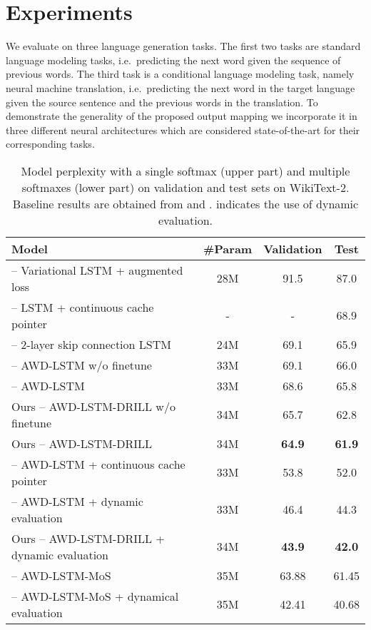 \documentclass{article}
\begin{document}
\section{Experiments}
\label{eval}

We evaluate on three language generation tasks.  The first two tasks are standard language modeling tasks, i.e.~predicting the next word given the sequence of previous words.  The third task is a conditional language modeling task, namely neural machine translation, i.e.~predicting the next word in the target language given the source sentence and the previous words in the translation.  To demonstrate the generality of the proposed output mapping we incorporate it in three different neural architectures which are considered state-of-the-art for their corresponding tasks.

\begin{table*}[t]\small
	\centering
	\begin{tabular}{l|ccc}
		\toprule
		\bf Model & \bf \#Param & \bf Validation &  \bf Test \\
		\midrule
		\citet{inan2016tying} -- Variational LSTM  + augmented loss & 28M & 91.5 & 87.0 \\
		\citet{grave2016improving} -- LSTM + continuous cache pointer & - & - & 68.9 \\
		\citet{melis2017state} -- 2-layer skip connection LSTM & 24M & 69.1 & 65.9 \\
		\midrule
		\citet{merity2017regularizing} -- AWD-LSTM w/o finetune & 33M & 69.1 & 66.0 \\
		\citet{merity2017regularizing} -- AWD-LSTM & 33M & 68.6 & 65.8 \\
		Ours -- AWD-LSTM-DRILL w/o finetune & 34M & {65.7}  & {62.8}  \\ Ours -- AWD-LSTM-DRILL  & 34M & \textbf{64.9}  & \textbf{61.9}  \\ \midrule
		\citet{merity2017regularizing} -- AWD-LSTM + continuous cache pointer & 33M & 53.8 & 52.0 \\
		\citet{krause2017dynamic} -- AWD-LSTM + dynamic evaluation & 33M & 46.4 & 44.3 \\
		Ours -- AWD-LSTM-DRILL + dynamic evaluation & 34M & \textbf{43.9} &  \textbf{42.0}  \\
		\midrule \midrule
		\citet{mos2018} -- AWD-LSTM-MoS & 35M & {63.88} & {61.45} \\
		\citet{mos2018} -- AWD-LSTM-MoS + dynamical evaluation & 35M & {42.41} & {40.68} \\
		\bottomrule
	\end{tabular}
	\vspace{-1mm}
	\caption{\small 
		Model perplexity with a single softmax (upper part) and multiple softmaxes (lower part) on validation and test sets on WikiText-2. Baseline results are obtained from \citet{merity2017regularizing} and \citet{krause2017dynamic}.  indicates the use of dynamic evaluation.
	}
	\vspace{-4mm}
	\label{table:WT2}
\end{table*}
 
\end{document}
